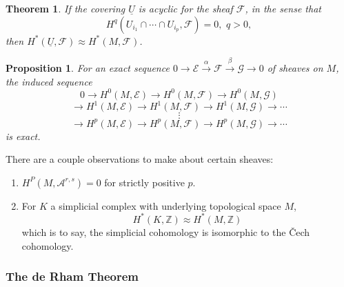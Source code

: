 \documentclass{article}
\newtheorem{thm}{Theorem}
\newtheorem{prop}{Proposition}
\begin{document}
\begin{thm}

	If the covering $ \underline{U}$ is acyclic for the sheaf $ \mathcal{F}$, in the sense that
\[
	H^q( U_{i_1} \cap \cdots \cap U_{i_p}, \mathcal{F}) = 0, \hspace{4pt} q>0, 
\]
then $H^* \left( \underline{U}, \mathcal{F} \right) \approx H^* (M, \mathcal{F})$.\\
\indent

\end{thm}


\begin{prop}

	For an exact sequence $ 0 \to \mathcal{E} \xrightarrow{\alpha} \mathcal{F} \xrightarrow{\beta} \mathcal{G} \to 0$ of sheaves on $M$, the induced sequence
	\[
		0 \to H^0 \left( M, \mathcal{E} \right) \to H^0 \left( M, \mathcal{F} \right) \to H^0 \left( M, \mathcal{G} \right) 
	\]
	\[
		\to H^1 \left( M, \mathcal{E} \right) \to H^1 \left( M, \mathcal{F} \right) \to H^1 \left( M, \mathcal{G} \right) \to \cdots
	\]
	\[
	\vdots
	\]
\[
\to H^p \left( M, \mathcal{E} \right) \to H^p \left( M, \mathcal{F} \right) \to H^p \left( M, \mathcal{G} \right) \to \cdots
\]
is exact.

\end{prop}

There are a couple observations to make about certain sheaves:

\begin{enumerate}
	\item $H^P \left( M, \mathcal{A}^{r,s} \right) =0$ for strictly positive $p$.
	\item For $K$ a simplicial complex with underlying topological space $M$,
		\[
			H^* \left( K, \mathbb{Z} \right) \approx H^* \left( M, \mathbb{Z} \right) 
		\]
		which is to say, the simplicial cohomology is isomorphic to the \v{C}ech cohomology.
\end{enumerate}

\subsubsection{The de Rham Theorem}
\end{document}

